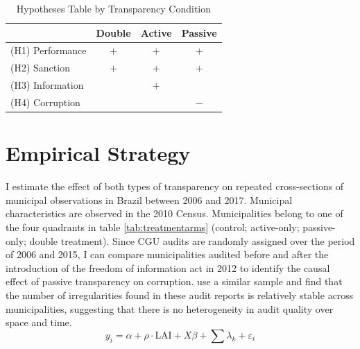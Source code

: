 \documentclass[11pt]{article}
\newcommand{\T}{\rule{0pt}{2.6ex}}            %
\newcommand{\B}{\rule[-1.2ex]{0pt}{0pt}}      %
\begin{document}
\begin{table}[!htbp]
  \caption{Hypotheses Table by Transparency Condition}
  \label{tab:hypotheses3}
  \centering
  \scriptsize
  \begin{tabular}{l|p{1.5cm}|p{1.5cm}|p{1.5cm}}
  \hline
  \hline
                   & \multicolumn{1}{c}{Double}& \multicolumn{1}{c}{Active}& \multicolumn{1}{c}{Passive} \T \B \\
  \hline
  (H1) Performance & \multicolumn{1}{c}{$+$}   & \multicolumn{1}{c}{$+$}   & \multicolumn{1}{c}{$+$}     \T \B \\
  (H2) Sanction    & \multicolumn{1}{c}{$+$}   & \multicolumn{1}{c}{$+$}   & \multicolumn{1}{c}{$+$}     \T \B \\
  (H3) Information & \multicolumn{1}{c}{}      & \multicolumn{1}{c}{$+$}   & \multicolumn{1}{c}{}     \T \B \\
  (H4) Corruption  & \multicolumn{1}{c}{}      & \multicolumn{1}{c}{}   & \multicolumn{1}{c}{$-$}     \T \B \\
  \hline
  \hline
  \end{tabular}
\end{table}

\section{Empirical Strategy} \label{sec:methods_paper3}

I estimate the effect of both types of transparency on repeated cross-sections of municipal observations in Brazil between 2006 and 2017. Municipal characteristics are observed in the 2010 Census. Municipalities belong to one of the four quadrants in table \ref{tab:treatmentarms} (control; active-only; passive-only; double treatment). Since CGU audits are randomly assigned over the period of 2006 and 2015, I can compare municipalities audited before and after the introduction of the freedom of information act in 2012 to identify the causal effect of passive transparency on corruption. \citet{AvisGovernmentAuditsReduce2018} use a similar sample and find that the number of irregularities found in these audit reports is relatively stable across municipalities, suggesting that there is no heterogeneity in audit quality over space and time.
\begin{equation} \label{eq:eq1_paper3}
  y_{i} = \alpha + \rho \cdot \text{LAI} + X \beta + \sum \lambda_{k} + \varepsilon_{i}
\end{equation}
\end{document}
